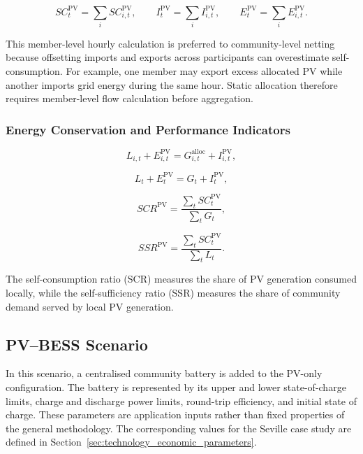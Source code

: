 \begin{equation}
\label{eq:pv_aggregated_flows}
SC^{\mathrm{PV}}_t = \sum_i SC^{\mathrm{PV}}_{i,t}, \qquad I^{\mathrm{PV}}_t = \sum_i I^{\mathrm{PV}}_{i,t}, \qquad E^{\mathrm{PV}}_t = \sum_i E^{\mathrm{PV}}_{i,t}.
\end{equation}

This member-level hourly calculation is preferred to community-level netting because offsetting imports and exports across participants can overestimate self-consumption. For example, one member may export excess allocated PV while another imports grid energy during the same hour. Static allocation therefore requires member-level flow calculation before aggregation.

\subsubsection{Energy Conservation and Performance Indicators}
\label{subsec:energy_conservation_indicators_pv_only}

\begin{equation}
\label{eq:pv_member_energy_conservation}
L_{i,t} + E^{\mathrm{PV}}_{i,t} = G^{\mathrm{alloc}}_{i,t} + I^{\mathrm{PV}}_{i,t},
\end{equation}

\begin{equation}
\label{eq:pv_community_energy_conservation}
L_t + E^{\mathrm{PV}}_t = G_t + I^{\mathrm{PV}}_t,
\end{equation}

\begin{equation}
\label{eq:scr_pv}
SCR^{\mathrm{PV}} = \frac{\sum_t SC^{\mathrm{PV}}_t}{\sum_t G_t},
\end{equation}

\begin{equation}
\label{eq:ssr_pv}
SSR^{\mathrm{PV}} = \frac{\sum_t SC^{\mathrm{PV}}_t}{\sum_t L_t}.
\end{equation}

The self-consumption ratio (SCR) measures the share of PV generation consumed locally, while the self-sufficiency ratio (SSR) measures the share of community demand served by local PV generation.

\subsection{PV--BESS Scenario}
\label{sec:pv_bess_scenario_ch4}

In this scenario, a centralised community battery is added to the PV-only configuration. The battery is represented by its upper and lower state-of-charge limits, charge and discharge power limits, round-trip efficiency, and initial state of charge. These parameters are application inputs rather than fixed properties of the general methodology. The corresponding values for the Seville case study are defined in Section~\ref{sec:technology_economic_parameters}.

